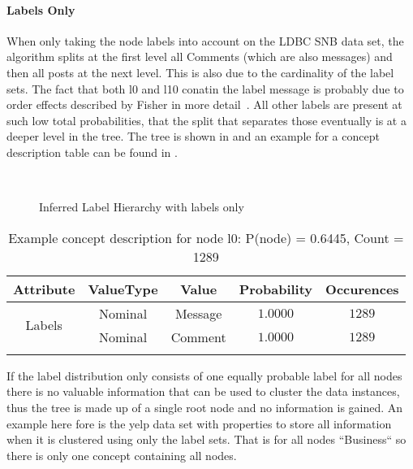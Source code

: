 \paragraph{Labels Only}
When only taking the node labels into account on the LDBC SNB data set, the algorithm splits at the first level all Comments (which are also messages) and then all posts at the next level. This is also due to the cardinality of the label sets. The fact that both l0 and l10 conatin the label message is probably due to order effects described by Fisher in more detail~\cite{Fisher1987}. All other labels are present at such low total probabilities, that the split that separates those eventually is at a deeper level in the tree. The tree is shown in  and an example for a concept description table can be found in . \\

\begin{figure}[htp]
    \centering
     \\
    \caption{Inferred Label Hierarchy with labels only}
    \label{fig:lldbctree}
\end{figure}{}
\begin{table}[H] 
  \centering 
 \begin{longtable}{|c|c|c|c|c|} \hline 
Attribute & ValueType & Value & Probability & Occurences \\ \hline 
\multirow{2}{*}{Labels} & Nominal & Message & $1.0000$ & $1289$ \\ \cline{2-5} 
 & Nominal & Comment & $1.0000$ & $1289$ \\ \hline 
 \captionsetup{position=top}
 \caption{Example concept description for node l0: P(node) = 0.6445, Count = 1289}\label{l0ex}
\end{longtable}
 \end{table} 

If the label distribution only consists of one equally probable label for all nodes there is no valuable information that can be used to cluster the data instances, thus the tree is made up of a single root node and no information is gained. An example here fore is the yelp data set with properties to store all information when it is clustered using only the label sets. That is for all nodes ``Business`` so there is only one concept containing all nodes. \\
 
